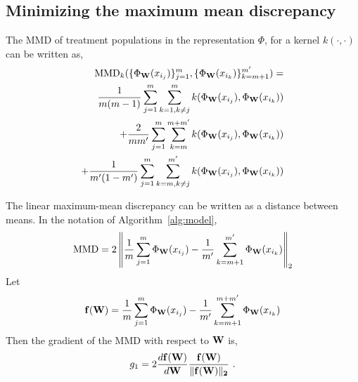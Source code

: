 \subsection{Minimizing the maximum mean discrepancy}

The MMD of treatment populations in the representation $\Phi$, for a kernel $k(\cdot,\cdot)$ can be written as,
\begin{align}
\text{MMD}_k(\{\Phi_{\bf{W}}(x_{i_j})\}_{j=1}^m, \{\Phi_{\bf{W}}(x_{i_{k}})\}_{k=m+1}^{m'} ) = \\
\frac{1}{m(m-1)}\sum_{j=1}^m \sum_{k=1,k\neq j}^{m} k(\Phi_{\bf{W}}(x_{i_j}), \Phi_{\bf{W}}(x_{i_k})) \\
+ \frac{2}{mm'}\sum_{j=1}^m \sum_{k=m}^{m+m'} k(\Phi_{\bf{W}}(x_{i_j}), \Phi_{\bf{W}}(x_{i_k})) \\
+ \frac{1}{m'(1-m')}\sum_{j=1}^m \sum_{k=m,k\neq j}^{m'} k(\Phi_{\bf{W}}(x_{i_j}), \Phi_{\bf{W}}(x_{i_k}))
\end{align}



The linear maximum-mean discrepancy can be written as a distance between means. In the notation of Algorithm~\ref{alg:model},
$$
\text{MMD} = 2\left\| \frac{1}{m}\sum_{j=1}^m \Phi_{\bf{W}}(x_{i_j}) -\frac{1}{m'}\sum_{k=m+1}^{m'} \Phi_{\bf{W}}(x_{i_k})\right\|_2
$$
Let
$$
{\bf f}({\bf W}) = \frac{1}{m}\sum_{j=1}^m \Phi_{\bf{W}}(x_{i_j}) - \frac{1}{m'}\sum_{k=m+1}^{m+m'} \Phi_{\bf{W}}(x_{i_k})
$$
Then the gradient of the MMD with respect to $\bf{W}$ is,
$$
g_1 = 2 \frac{d \bf{f}(\bf{W})}{d\bf{W}} \frac{\bf{f}(\bf{W})}{\|\bf{f}(\bf{W})\|_2} ~.
$$

